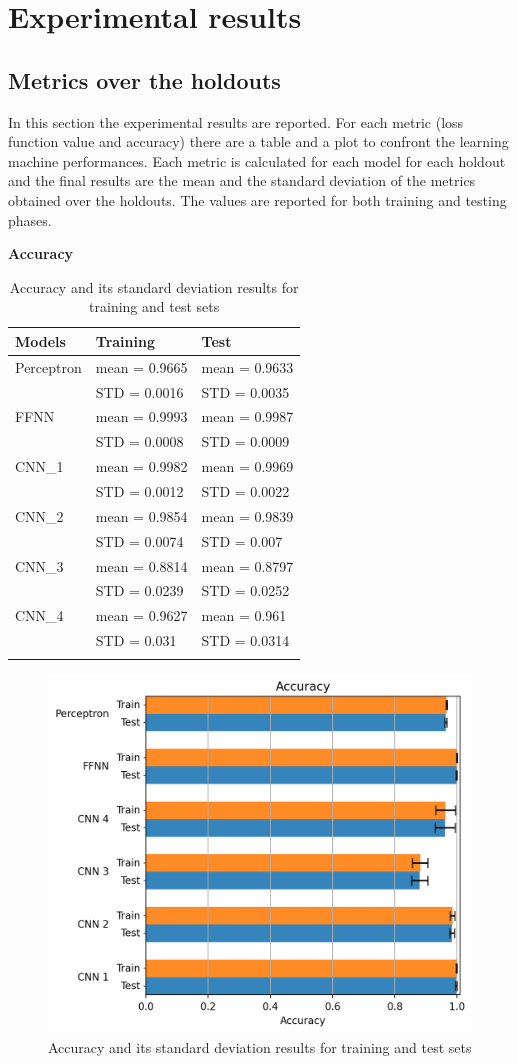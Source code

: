 \section{Experimental results}\label{header-n500}

\subsection{Metrics over the holdouts}\label{header-n501}

In this section the experimental results are reported. For each metric
(loss function value and accuracy) there are a table and a plot to
confront the learning machine performances. Each metric is calculated for
each model for each holdout and the final results are the mean and the
standard deviation of the metrics obtained over the holdouts. The values
are reported for both training and testing phases.

\newpage
\textbf{Accuracy}

\begin{longtable}[]{@{}lll@{}}
\toprule
\textbf{Models} & \textbf{Training} & \textbf{Test}\tabularnewline
\midrule
\endhead
Perceptron & mean = 0.9665 & mean = 0.9633\tabularnewline
& STD = 0.0016 & STD = 0.0035\tabularnewline
FFNN & mean = 0.9993 & mean = 0.9987\tabularnewline
& STD = 0.0008 & STD = 0.0009\tabularnewline
CNN\_1 & mean = 0.9982 & mean = 0.9969\tabularnewline
& STD = 0.0012 & STD = 0.0022\tabularnewline
CNN\_2 & mean = 0.9854 & mean = 0.9839\tabularnewline
& STD = 0.0074 & STD = 0.007\tabularnewline
CNN\_3 & mean = 0.8814 & mean = 0.8797\tabularnewline
& STD = 0.0239 & STD = 0.0252\tabularnewline
CNN\_4 & mean = 0.9627 & mean = 0.961\tabularnewline
& STD = 0.031 & STD = 0.0314\tabularnewline
\bottomrule
\caption{Accuracy and its standard deviation results for training and test sets}
\end{longtable}

\begin{figure}[h!]
	\centering
	\includegraphics[width=0.85\linewidth]{../images/accuracy.png}
	\caption{Accuracy and its standard deviation results for training and test sets}
\end{figure}

